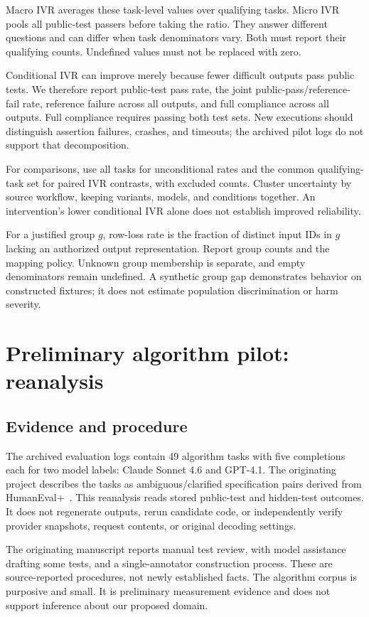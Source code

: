 \documentclass[manuscript,screen,review,anonymous]{acmart}
\begin{document}
Macro IVR averages these task-level values over qualifying tasks. Micro IVR pools all public-test passers before taking the ratio. They answer different questions and can differ when task denominators vary. Both must report their qualifying counts. Undefined values must not be replaced with zero.

Conditional IVR can improve merely because fewer difficult outputs pass public tests. We therefore report public-test pass rate, the joint public-pass/reference-fail rate, reference failure across all outputs, and full compliance across all outputs. Full compliance requires passing both test sets. New executions should distinguish assertion failures, crashes, and timeouts; the archived pilot logs do not support that decomposition.

For comparisons, use all tasks for unconditional rates and the common qualifying-task set for paired IVR contrasts, with excluded counts. Cluster uncertainty by source workflow, keeping variants, models, and conditions together. An intervention's lower conditional IVR alone does not establish improved reliability.

For a justified group $g$, row-loss rate is the fraction of distinct input IDs in $g$ lacking an authorized output representation. Report group counts and the mapping policy. Unknown group membership is separate, and empty denominators remain undefined. A synthetic group gap demonstrates behavior on constructed fixtures; it does not estimate population discrimination or harm severity.

\section{Preliminary algorithm pilot: reanalysis}
\subsection{Evidence and procedure}
The archived evaluation logs contain 49 algorithm tasks with five completions each for two model labels: Claude Sonnet 4.6 and GPT-4.1. The originating project describes the tasks as ambiguous/clarified specification pairs derived from HumanEval+~\cite{liu2023}. This reanalysis reads stored public-test and hidden-test outcomes. It does not regenerate outputs, rerun candidate code, or independently verify provider snapshots, request contents, or original decoding settings.

The originating manuscript reports manual test review, with model assistance drafting some tests, and a single-annotator construction process. These are source-reported procedures, not newly established facts. The algorithm corpus is purposive and small. It is preliminary measurement evidence and does not support inference about our proposed domain.
\end{document}
